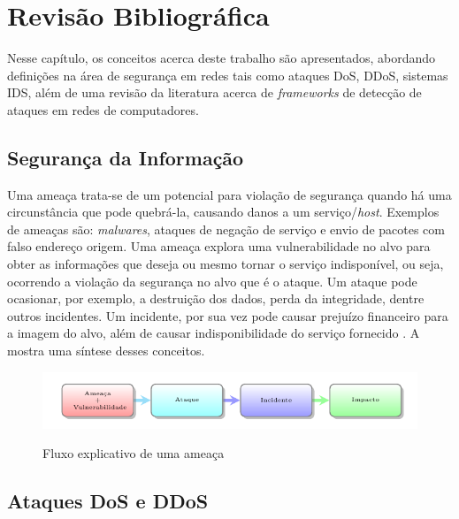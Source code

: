 \chapter[Revisão Bibliográfica]{Revisão Bibliográfica}
\label{fundamentacao}
Nesse capítulo, os conceitos acerca deste trabalho são apresentados, abordando definições na área de segurança em redes tais como ataques DoS, DDoS, sistemas IDS, além de uma revisão da literatura acerca de \textit{frameworks} de detecção de ataques em redes de computadores. 
\section{Segurança da Informação}
Uma ameaça trata-se de um potencial para violação de segurança quando há uma circunstância que pode quebrá-la, causando danos a um serviço/\textit{host}. Exemplos de ameaças são: \textit{malwares}, ataques de negação de serviço e envio de pacotes com falso endereço origem. Uma ameaça explora uma vulnerabilidade no alvo para obter as informações que deseja ou mesmo tornar o serviço indisponível, ou seja, ocorrendo a violação da segurança no alvo que é o ataque. Um ataque pode ocasionar, por exemplo, a destruição dos dados, perda da integridade, dentre outros incidentes. Um incidente, por sua vez pode causar prejuízo financeiro para a imagem do alvo, além de causar indisponibilidade do serviço fornecido \cite{kurose}. A  mostra uma síntese desses conceitos.   

 \begin{figure}[ht]
 	\centering
 	\caption{Fluxo explicativo de uma ameaça }
 	\includegraphics[width=1\textwidth]{figs/ameacas.pdf}\\
 	\label{fig:ameacas}
 \end{figure}
 
 \section{Ataques DoS e DDoS}

